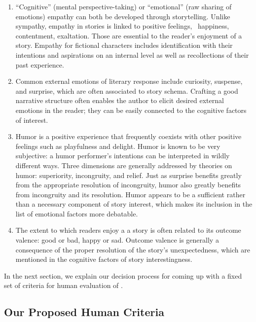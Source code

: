 \begin{itemize}[noitemsep]
    \begin{enumerate}
        \item ``Cognitive'' (mental perspective-taking) or ``emotional'' (raw sharing of emotions) empathy can both be developed through storytelling. Unlike sympathy, empathy in stories is linked to positive feelings, {\eg}\ happiness, contentment, exaltation. Those are essential to the reader's enjoyment of a story. Empathy for fictional characters includes identification with their intentions and aspirations on an internal level as well as recollections of their past experience.
        \item Common external emotions of literary response include curiosity, suspense, and surprise, which are often associated to story schema. Crafting a good narrative structure often enables the author to elicit desired external emotions in the reader; they can be easily connected to the cognitive factors of interest.
        \item Humor is a positive experience that frequently coexists with other positive feelings such as playfulness and delight. Humor is known to be very subjective: a humor performer's intentions can be interpreted in wildly different ways. Three dimensions are generally addressed by theories on humor: superiority, incongruity, and relief. Just as surprise benefits greatly from the appropriate resolution of incongruity, humor also greatly benefits from incongruity and its resolution. Humor appears to be a sufficient rather than a necessary component of story interest, which makes its inclusion in the list of emotional factors more debatable.
        \item The extent to which readers enjoy a a story is often related to its outcome valence: good or bad, happy or sad. Outcome valence is generally a consequence of the proper resolution of the story's unexpectedness, which are mentioned in the cognitive factors of story interestingness.
    \end{enumerate}
\end{itemize}

In the next section, we explain our decision process for coming up with a fixed set of criteria for human evaluation of {\asg}.

\subsection{Our Proposed Human Criteria}
\label{sub:our_criteria}

